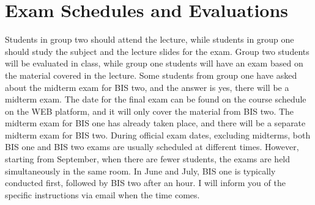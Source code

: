 \section{Exam Schedules and
    Evaluations}\label{exam-schedules-and-evaluations}

Students in group two should attend the lecture, while students in group
one should study the subject and the lecture slides for the exam. Group
two students will be evaluated in class, while group one students will
have an exam based on the material covered in the lecture. Some students
from group one have asked about the midterm exam for BIS two, and the
answer is yes, there will be a midterm exam. The date for the final exam
can be found on the course schedule on the WEB platform, and it will
only cover the material from BIS two. The midterm exam for BIS one has
already taken place, and there will be a separate midterm exam for BIS
two.
During official exam dates, excluding midterms, both BIS one and BIS two
exams are usually scheduled at different times. However, starting from
September, when there are fewer students, the exams are held
simultaneously in the same room. In June and July, BIS one is typically
conducted first, followed by BIS two after an hour. I will inform you of
the specific instructions via email when the time comes.